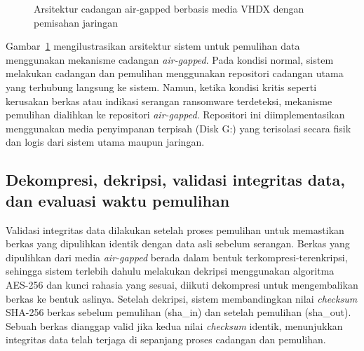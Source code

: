 \documentclass{iaesarticle}
\begin{document}
\begin{figure}[H]
\centering
{}
\vspace{.7em}
\caption{Arsitektur cadangan air-gapped berbasis media VHDX dengan pemisahan jaringan}
\label{fig:vhdx}
\end{figure}

Gambar~\ref{fig:vhdx} mengilustrasikan arsitektur sistem untuk pemulihan data menggunakan mekanisme cadangan \textit{air-gapped}. Pada kondisi normal, sistem melakukan cadangan dan pemulihan menggunakan repositori cadangan utama yang terhubung langsung ke sistem. Namun, ketika kondisi kritis seperti kerusakan berkas atau indikasi serangan ransomware terdeteksi, mekanisme pemulihan dialihkan ke repositori \textit{air-gapped}. Repositori ini diimplementasikan menggunakan media penyimpanan terpisah (Disk G:) yang terisolasi secara fisik dan logis dari sistem utama maupun jaringan.

\subsection{Dekompresi, dekripsi, validasi integritas data, dan evaluasi waktu pemulihan}
Validasi integritas data dilakukan setelah proses pemulihan untuk memastikan berkas yang dipulihkan identik dengan data asli sebelum serangan. Berkas yang dipulihkan dari media \textit{air-gapped} berada dalam bentuk terkompresi-terenkripsi, sehingga sistem terlebih dahulu melakukan dekripsi menggunakan algoritma AES-256 dan kunci rahasia yang sesuai, diikuti dekompresi untuk mengembalikan berkas ke bentuk aslinya. Setelah dekripsi, sistem membandingkan nilai \textit{checksum} SHA-256 berkas sebelum pemulihan (sha\_in) dan setelah pemulihan (sha\_out). Sebuah berkas dianggap valid jika kedua nilai \textit{checksum} identik, menunjukkan integritas data telah terjaga di sepanjang proses cadangan dan pemulihan.
\end{document}
